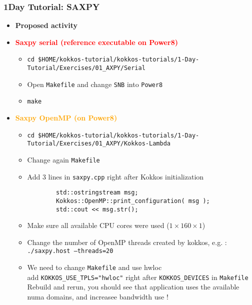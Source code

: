 \begin{frame}[fragile=singleslide]
  \frametitle{1Day Tutorial: SAXPY}

  \begin{itemize}
  \item \textbf{Proposed activity}
  \item \textcolor{red}{\textbf{Saxpy serial (reference executable on Power8)}}
    \begin{itemize}
    \item \texttt{cd \$HOME/kokkos-tutorial/kokkos-tutorials/1-Day-Tutorial/Exercises/01\_AXPY/Serial}
    \item Open \texttt{Makefile} and change \texttt{SNB} into \texttt{Power8}
    \item \texttt{make}
    \end{itemize}
  \item \textcolor{orange}{\textbf{Saxpy OpenMP (on Power8)}}
    \begin{itemize}
    \item \texttt{cd \$HOME/kokkos-tutorial/kokkos-tutorials/1-Day-Tutorial/Exercises/01\_AXPY/Kokkos-Lambda}
    \item Change again \texttt{Makefile}
    \item Add 3 lines in \texttt{saxpy.cpp} right after Kokkos initialization
      \begin{verbatim}
        std::ostringstream msg;
        Kokkos::OpenMP::print_configuration( msg );
        std::cout << msg.str();
      \end{verbatim}
    \item Make sure all available CPU cores were used ($1\times 160 \times 1$)
    \item Change the number of OpenMP threads created by kokkos, e.g. :\\
      \texttt{./saxpy.host  --threads=20}
    \item We need to change \texttt{Makefile} and use hwloc\\
      add \texttt{KOKKOS\_USE\_TPLS="hwloc"} right after \texttt{KOKKOS\_DEVICES} in \texttt{Makefile}\\
      Rebuild and rerun, you should see that application uses the available numa domains, and increasee bandwidth use !
    \end{itemize}
  \end{itemize}

\end{frame}

